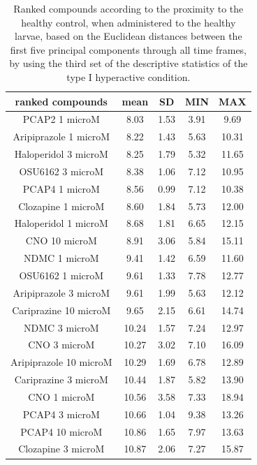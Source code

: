 \documentclass[a4paper,12pt]{article}
\begin{document}
\begin{table}[h!]\tiny
\centering
\caption{Ranked compounds according to the proximity to the healthy control, when administered to the healthy larvae, based on the Euclidean distances between the first five principal components through all time frames, by using the third set of the descriptive statistics of the type I hyperactive condition.}
\begin{tabular}{|c|c|c|c|c|}
\hline
ranked compounds             & mean & SD   & MIN  & MAX   \\ \hline
PCAP2 1 microM         & 8.03  & 1.53 & 3.91  & 9.69  \\ \hline
Aripiprazole 1 microM  & 8.22  & 1.43 & 5.63  & 10.31 \\ \hline
Haloperidol 3 microM   & 8.25  & 1.79 & 5.32  & 11.65 \\ \hline
OSU6162 3 microM       & 8.38  & 1.06 & 7.12  & 10.95 \\ \hline
PCAP4 1 microM       & 8.56  & 0.99 & 7.12  & 10.38 \\ \hline
Clozapine 1 microM     & 8.60   & 1.84 & 5.73  & 12.00    \\ \hline
Haloperidol 1 microM   & 8.68  & 1.81 & 6.65  & 12.15 \\ \hline
CNO 10 microM          & 8.91  & 3.06 & 5.84  & 15.11 \\ \hline
NDMC 1 microM          & 9.41  & 1.42 & 6.59  & 11.60  \\ \hline
OSU6162 1 microM       & 9.61  & 1.33 & 7.78  & 12.77 \\ \hline
Aripiprazole 3 microM  & 9.61  & 1.99 & 5.63  & 12.12 \\ \hline
Cariprazine 10 microM  & 9.65  & 2.15 & 6.61  & 14.74 \\ \hline
NDMC 3 microM          & 10.24 & 1.57 & 7.24  & 12.97 \\ \hline
CNO 3 microM           & 10.27 & 3.02 & 7.10   & 16.09 \\ \hline
Aripiprazole 10 microM & 10.29 & 1.69 & 6.78  & 12.89 \\ \hline 
Cariprazine 3 microM   & 10.44 & 1.87 & 5.82  & 13.90  \\ \hline
CNO 1 microM           & 10.56 & 3.58 & 7.33  & 18.94 \\ \hline
PCAP4 3 microM       & 10.66 & 1.04 & 9.38  & 13.26 \\ \hline
PCAP4 10 microM      & 10.86 & 1.65 & 7.97  & 13.63 \\ \hline
Clozapine 3 microM     & 10.87 & 2.06 & 7.27  & 15.87 \\ \hline

\end{tabular}
\end{table}
\end{document}
